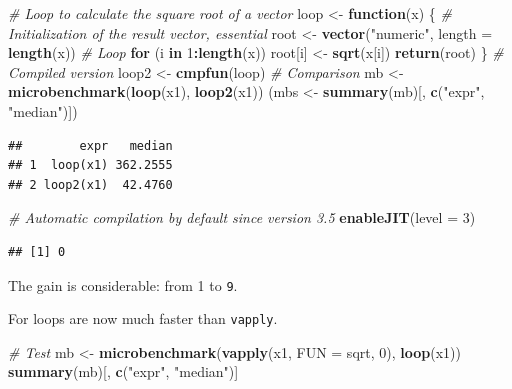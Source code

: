 \documentclass[
  12pt,
  american,
  a4paper,
  extrafontsizes,onecolumn,openright
  ]{memoir}
\newenvironment{Shaded}{\begin{snugshade}}{\end{snugshade}}
\newcommand{\AttributeTok}[1]{\textcolor[rgb]{0.13,0.29,0.53}{#1}}
\newcommand{\CommentTok}[1]{\textcolor[rgb]{0.56,0.35,0.01}{\textit{#1}}}
\newcommand{\ControlFlowTok}[1]{\textcolor[rgb]{0.13,0.29,0.53}{\textbf{#1}}}
\newcommand{\DecValTok}[1]{\textcolor[rgb]{0.00,0.00,0.81}{#1}}
\newcommand{\FunctionTok}[1]{\textcolor[rgb]{0.13,0.29,0.53}{\textbf{#1}}}
\newcommand{\NormalTok}[1]{#1}
\newcommand{\OtherTok}[1]{\textcolor[rgb]{0.56,0.35,0.01}{#1}}
\newcommand{\SpecialCharTok}[1]{\textcolor[rgb]{0.81,0.36,0.00}{\textbf{#1}}}
\newcommand{\StringTok}[1]{\textcolor[rgb]{0.31,0.60,0.02}{#1}}
\begin{document}
\begin{Shaded}
\begin{Highlighting}[]
\CommentTok{\# Loop to calculate the square root of a vector}
\NormalTok{loop }\OtherTok{\textless{}{-}} \ControlFlowTok{function}\NormalTok{(x) \{}
  \CommentTok{\# Initialization of the result vector, essential}
\NormalTok{  root }\OtherTok{\textless{}{-}} \FunctionTok{vector}\NormalTok{(}\StringTok{"numeric"}\NormalTok{, }\AttributeTok{length =} \FunctionTok{length}\NormalTok{(x))}
  \CommentTok{\# Loop}
  \ControlFlowTok{for}\NormalTok{ (i }\ControlFlowTok{in} \DecValTok{1}\SpecialCharTok{:}\FunctionTok{length}\NormalTok{(x)) root[i] }\OtherTok{\textless{}{-}} \FunctionTok{sqrt}\NormalTok{(x[i])}
  \FunctionTok{return}\NormalTok{(root)}
\NormalTok{\}}
\CommentTok{\# Compiled version}
\NormalTok{loop2 }\OtherTok{\textless{}{-}} \FunctionTok{cmpfun}\NormalTok{(loop)}
\CommentTok{\# Comparison}
\NormalTok{mb }\OtherTok{\textless{}{-}} \FunctionTok{microbenchmark}\NormalTok{(}\FunctionTok{loop}\NormalTok{(x1), }\FunctionTok{loop2}\NormalTok{(x1))}
\NormalTok{(mbs }\OtherTok{\textless{}{-}} \FunctionTok{summary}\NormalTok{(mb)[, }\FunctionTok{c}\NormalTok{(}\StringTok{"expr"}\NormalTok{, }\StringTok{"median"}\NormalTok{)])}
\end{Highlighting}
\end{Shaded}

\begin{verbatim}
##        expr   median
## 1  loop(x1) 362.2555
## 2 loop2(x1)  42.4760
\end{verbatim}

\begin{Shaded}
\begin{Highlighting}[]
\CommentTok{\# Automatic compilation by default since version 3.5}
\FunctionTok{enableJIT}\NormalTok{(}\AttributeTok{level =} \DecValTok{3}\NormalTok{)}
\end{Highlighting}
\end{Shaded}

\begin{verbatim}
## [1] 0
\end{verbatim}

\normalsize

The gain is considerable: from 1 to \texttt{9}.

For loops are now much faster than \texttt{vapply}.

\scriptsize

\begin{Shaded}
\begin{Highlighting}[]
\CommentTok{\# Test}
\NormalTok{mb }\OtherTok{\textless{}{-}} \FunctionTok{microbenchmark}\NormalTok{(}\FunctionTok{vapply}\NormalTok{(x1, }\AttributeTok{FUN =}\NormalTok{ sqrt, }\DecValTok{0}\NormalTok{), }\FunctionTok{loop}\NormalTok{(x1))}
\FunctionTok{summary}\NormalTok{(mb)[, }\FunctionTok{c}\NormalTok{(}\StringTok{"expr"}\NormalTok{, }\StringTok{"median"}\NormalTok{)]}
\end{Highlighting}
\end{Shaded}
\end{document}
